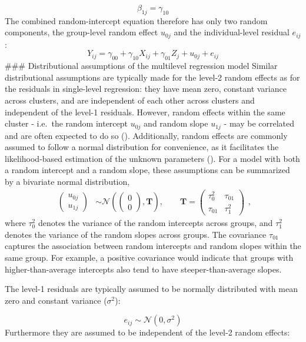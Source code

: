 \documentclass[
  letterpaper,
  11pt,
  english,
  singlespacing,
  headsepline,
  openany]{MastersDoctoralThesis}
\begin{document}
\[
\beta_{1j} = \gamma_{10}
\] The combined random-intercept equation therefore has only two random
components, the group-level random effect \(u_{0j}\) and the
individual-level residual \(e_{ij}\): \[ 
Y_{ij} = \gamma_{00} + \gamma_{10}X_{ij} + \gamma_{01}Z_j + u_{0j} + e_{ij}
\] \#\#\# Distributional assumptions of the multilevel regression model
Similar distributional assumptions are typically made for the level-2
random effects as for the residuals in single-level regression: they
have mean zero, constant variance across clusters, and are independent
of each other across clusters and independent of the level-1 residuals.
However, random effects within the same cluster - i.e.~the random
intercept \(u_{0j}\) and random slope \(u_{1j}\) - may be correlated and
are often expected to do so (). Additionally, random effects are commonly assumed to
follow a normal distribution for convenience, as it facilitates the
likelihood-based estimation of the unknown parameters
(). For a model
with both a random intercept and a random slope, these assumptions can
be summarized by a bivariate normal distribution, \[
\begin{aligned}
\begin{pmatrix}
u_{0j} \\
u_{1j}
\end{pmatrix}
&\sim \mathcal{N}
\left(
\begin{pmatrix}
0 \\
0
\end{pmatrix},
\mathbf{T}
\right),
\qquad
\mathbf{T} =
\begin{pmatrix}
\tau_0^2 & \tau_{01} \\
\tau_{01} & \tau_1^2
\end{pmatrix}
\end{aligned},
\] where \(\tau_0^2\) denotes the variance of the random intercepts
across groups, and \(\tau_1^2\) denotes the variance of the random
slopes across groups. The covariance \(\tau_{01}\) captures the
association between random intercepts and random slopes within the same
group. For example, a positive covariance would indicate that groups
with higher-than-average intercepts also tend to have
steeper-than-average slopes.

The level-1 residuals are typically assumed to be normally distributed
with mean zero and constant variance (\(\sigma^2\)):

\[
e_{ij} \sim \mathcal{N}(0,\sigma^2)
\] Furthermore they are assumed to be independent of the level-2 random
effects:
\end{document}
